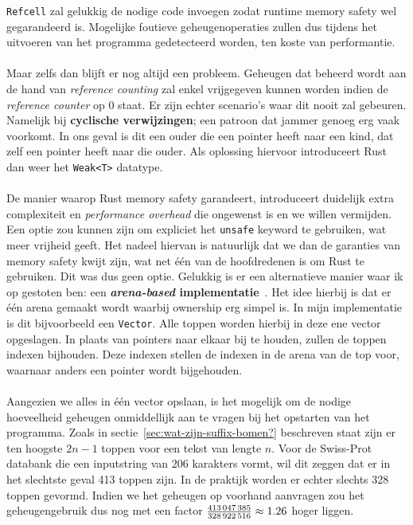 \texttt{Refcell} zal gelukkig de nodige code invoegen zodat runtime memory safety wel gegarandeerd is.
Mogelijke foutieve geheugenoperaties zullen dus tijdens het uitvoeren van het programma gedetecteerd worden, ten koste van performantie.
\\ \\
Maar zelfs dan blijft er nog altijd een probleem.
Geheugen dat beheerd wordt aan de hand van \textit{reference counting} zal enkel vrijgegeven kunnen worden indien de \textit{reference counter} op 0 staat.
Er zijn echter scenario's waar dit nooit zal gebeuren.
Namelijk bij \textbf{cyclische verwijzingen}; een patroon dat jammer genoeg erg vaak voorkomt.
In ons geval is dit een ouder die een pointer heeft naar een kind, dat zelf een pointer heeft naar die ouder.
Als oplossing hiervoor introduceert Rust dan weer het \texttt{Weak<T>} datatype.
\\ \\
De manier waarop Rust memory safety garandeert, introduceert duidelijk extra complexiteit en \textit{performance overhead} die ongewenst is en we willen vermijden.
Een optie zou kunnen zijn om expliciet het \texttt{unsafe} keyword te gebruiken, wat meer vrijheid geeft.
Het nadeel hiervan is natuurlijk dat we dan de garanties van memory safety kwijt zijn, wat net één van de hoofdredenen is om Rust te gebruiken.
Dit was dus geen optie.
Gelukkig is er een alternatieve manier waar ik op gestoten ben: een \textbf{\textit{arena-based} implementatie}~\cite{rust_arena_trees}.
Het idee hierbij is dat er één arena gemaakt wordt waarbij ownership erg simpel is.
In mijn implementatie is dit bijvoorbeeld een \texttt{Vector}.
Alle toppen worden hierbij in deze ene vector opgeslagen.
In plaats van pointers naar elkaar bij te houden, zullen de toppen indexen bijhouden.
Deze indexen stellen de indexen in de arena van de top voor, waarnaar anders een pointer wordt bijgehouden.
\\ \\
Aangezien we alles in één vector opslaan, is het mogelijk om de nodige hoeveelheid geheugen onmiddellijk aan te vragen bij het opstarten van het programma.
Zoals in sectie~\ref{sec:wat-zijn-suffix-bomen?} beschreven staat zijn er ten hoogste $2n - 1$ toppen voor een tekst van lengte $n$.
Voor de Swiss-Prot databank die een inputstring van 206 karakters vormt, wil dit zeggen dat er in het slechtste geval 413 toppen zijn.
In de praktijk worden er echter slechts 328 toppen gevormd.
Indien we het geheugen op voorhand aanvragen zou het geheugengebruik dus nog met een factor $\frac{413\thinspace047\thinspace385}{328\thinspace922\thinspace516} \approx 1.26$ hoger liggen.

